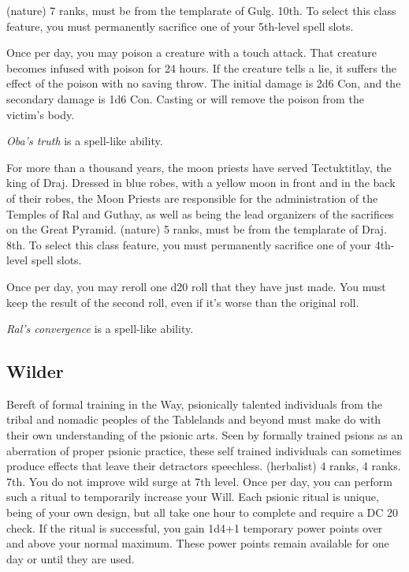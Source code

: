 { (nature) 7 ranks, must be from the templarate of Gulg.}
{10th.}
{To select this class feature, you must permanently sacrifice one of your 5th-level spell slots.}
{
	Once per day, you may poison a creature with a touch attack. That creature becomes infused with poison for 24 hours. If the creature tells a lie, it suffers the effect of the poison with no saving throw. The initial damage is 2d6 Con, and the secondary damage is 1d6 Con. Casting  or  will remove the poison from the victim's body.

	\emph{Oba's truth} is a spell-like ability.
}
{For more than a thousand years, the moon priests have served Tectuktitlay, the king of Draj. Dressed in blue robes, with a yellow moon in front and in the back of their robes, the Moon Priests are responsible for the administration of the Temples of Ral and Guthay, as well as being the lead organizers of the sacrifices on the Great Pyramid.}
{ (nature) 5 ranks, must be from the templarate of Draj.}
{8th.}
{To select this class feature, you must permanently sacrifice one of your 4th-level spell slots.}
{
	Once per day, you may reroll one d20 roll that they have just made. You must keep the result of the second roll, even if it's worse than the original roll.

	\emph{Ral's convergence} is a spell-like ability.
}





\subsection{Wilder}
{Bereft of formal training in the Way, psionically talented individuals from the tribal and nomadic peoples of the Tablelands and beyond must make do with their own understanding of the psionic arts. Seen by formally trained psions as an aberration of proper psionic practice, these self trained individuals can sometimes produce effects that leave their detractors speechless.}
{ (herbalist) 4 ranks,  4 ranks.}
{7th.}
{You do not improve wild surge at 7th level.}
{
	Once per day, you can perform such a ritual to temporarily increase your Will. Each psionic ritual is unique, being of your own design, but all take one hour to complete and require a DC 20  check. If the ritual is successful, you gain 1d4+1 temporary power points over and above your normal maximum. These power points remain available for one day or until they are used.
}

